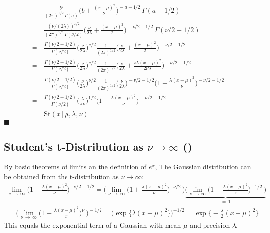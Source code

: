 \documentclass[11pt, a4paper]{scrartcl}
\newcommand{\given}{\,\vert\,}
\newcommand{\eot}{\hfill\(\blacksquare\)}
\newcommand{\diffstar}{\texorpdfstring{\raisebox{-1pt}{\resizebox{!}{8pt}{\(\star\)}}}{*}}
\newcommand{\onestar}  {(\diffstar)}
\begin{document}
			\begin{align}
				 &\, \frac{b^a}{(2\pi)^{1/2} \, \Gamma(a)} \bigg( b + \frac{(x - \mu)^2}{2} \bigg)^{\!-a - 1/2} \, \Gamma(a + 1/2) \\
				=&\, \frac{(\nu/(2\lambda))^{\nu / 2}}{(2\pi)^{1/2} \, \Gamma(\nu / 2)} \bigg( \frac{\nu}{2\lambda} + \frac{(x - \mu)^2}{2} \bigg)^{\!-\nu/2 - 1/2} \, \Gamma(\nu/2 + 1/2) \\
				=&\, \frac{\Gamma(\nu/2 + 1/2)}{\Gamma(\nu / 2)} \bigg( \frac{\nu}{2\lambda} \bigg)^{\nu/2} \frac{1}{(2\pi)^{1/2}} \bigg( \frac{\nu}{2\lambda} + \frac{(x - \mu)^2}{2} \bigg)^{\!-\nu/2 - 1/2} \\
				=&\, \frac{\Gamma(\nu/2 + 1/2)}{\Gamma(\nu / 2)} \bigg( \frac{\nu}{2\lambda} \bigg)^{\nu/2} \frac{1}{(2\pi)^{1/2}} \bigg( \frac{\nu}{2\lambda} + \frac{\nu \lambda (x - \mu)^2}{2 \nu \lambda} \bigg)^{\!-\nu/2 - 1/2} \\
				=&\, \frac{\Gamma(\nu/2 + 1/2)}{\Gamma(\nu / 2)} \bigg( \frac{\nu}{2\lambda} \bigg)^{\nu/2} \frac{1}{(2\pi)^{1/2}} \bigg( \frac{\nu}{2\lambda} \bigg)^{\!-\nu/2 - 1/2} \bigg(\! 1 + \frac{\lambda (x - \mu)^2}{\nu} \bigg)^{\!-\nu/2 - 1/2} \\
				=&\, \frac{\Gamma(\nu/2 + 1/2)}{\Gamma(\nu / 2)} \bigg( \frac{\lambda}{\pi\nu} \bigg)^{1/2} \bigg(\! 1+ \frac{\lambda (x - \mu)^2}{\nu} \bigg)^{\!-\nu/2 - 1/2} \\
				=&\, \mathrm{St}(x \given \mu, \lambda, \nu)
			\end{align}
			\eot

		\subsection{Student's t-Distribution as \( \nu \to \infty \)  \onestar}
			By basic theorems of limits an the definition of \( e^x \), The Gaussian distribution can be obtained from the t-distribution as \( \nu \to \infty \):
			\begin{gather}
				\lim\limits_{\nu \,\to\, \infty} \bigg(\! 1 + \frac{\lambda (x - \mu)^2}{\nu} \bigg)^{-\nu/2 - 1/2}
					= \Bigg(\! \lim\limits_{\nu \,\to\, \infty} \bigg(\! 1 + \frac{\lambda (x - \mu)^2}{\nu} \bigg)^{-\nu/2} \,\Bigg) \underbrace{\Bigg(\! \lim\limits_{\nu \,\to\, \infty} \bigg(\! 1 + \frac{\lambda (x - \mu)^2}{\nu} \bigg)^{-1/2} \,\Bigg)}_{=\, 1} \\
					= \Bigg(\! \lim\limits_{\nu \,\to\, \infty} \bigg(\! 1 + \frac{\lambda (x - \mu)^2}{\nu} \bigg)^{\nu} \,\Bigg)^{\!-1/2}
					= \Big(\! \exp\big\{ \lambda (x - \mu)^2 \big\} \Big)^{-1/2}
					= \exp\bigg\{\! -\frac{\lambda}{2} (x - \mu)^2 \bigg\}
			\end{gather}
			This equals the exponential term of a Gaussian with mean \(\mu\) and precision \(\lambda\).
\end{document}
